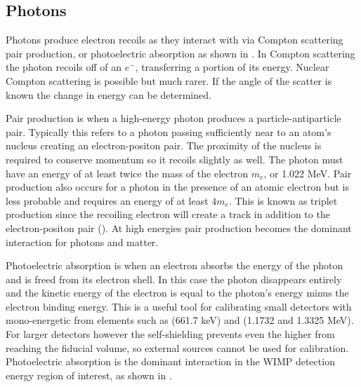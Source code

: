\subsection{Photons}
\label{subsec:photons}
Photons produce electron recoils as they interact with \electron via Compton scattering pair production, or photoelectric absorption
as shown in .  In Compton scattering the photon
recoils off of an $e^{-}$, transferring a portion of its energy.  Nuclear Compton scattering is possible but much rarer.  If the
angle of the scatter is known the change in energy can be determined.

Pair production is when a high-energy photon produces a particle-antiparticle pair.  Typically this refers to a photon passing sufficiently
near to an atom's nucleus creating an electron-positon pair.  The proximity of the nucleus is required to conserve momentum so it
recoils slightly as well.  The photon must have an energy of at least twice the mass of the electron $m_{e}$, or 1.022 MeV.  Pair production
also occurs for a photon in the presence of an atomic electron but is less probable and requires an energy of at least $4m_{e}$.  This
is known as triplet production since the recoiling electron will create a track in addition to the electron-positon pair
().  At high energies pair production becomes the dominant interaction for photons and matter.

Photoelectric absorption is when an electron absorbs the energy of the photon and is freed from its electron shell.  In this case the
photon disappears entirely and the kinetic energy of the electron is equal to the photon's energy minus the electron binding energy.  This
is a useful tool for calibrating small detectors with mono-energetic \gammarays from elements such as \cesium (661.7 keV) and \cobaltsixty
(1.1732 and 1.3325 MeV).  For larger detectors however the self-shielding prevents even the higher \gammarays from reaching the fiducial
volume, so external sources cannot be used for calibration.  Photoelectric absorption is the dominant interaction in the WIMP detection
energy region of interest, as shown in .

